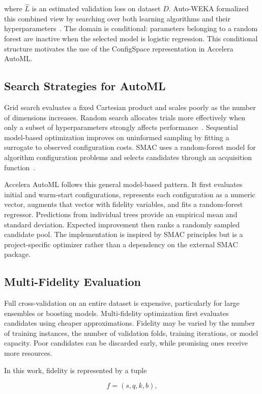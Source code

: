 \documentclass[12pt,a4paper]{report}
\begin{document}
\noindent where $\widehat{L}$ is an estimated validation loss on dataset $D$.
Auto-WEKA formalized this combined view by searching over both learning
algorithms and their hyperparameters~\cite{autoweka}. The domain is
conditional: parameters belonging to a random forest are inactive when the
selected model is logistic regression. This conditional structure motivates the
use of the ConfigSpace representation in Accelera AutoML.

\subsection{Search Strategies for AutoML}
Grid search evaluates a fixed Cartesian product and scales poorly as the number
of dimensions increases. Random search allocates trials more effectively when
only a subset of hyperparameters strongly affects performance~\cite{randomsearch}.
Sequential model-based optimization improves on uninformed sampling by fitting a
surrogate to observed configuration costs. SMAC uses a random-forest model for
algorithm configuration problems and selects candidates through an acquisition
function~\cite{smac}.

\medskip
\noindent Accelera AutoML follows this general model-based pattern. It first
evaluates initial and warm-start configurations, represents each configuration
as a numeric vector, augments that vector with fidelity variables, and fits a
random-forest regressor. Predictions from individual trees provide an empirical
mean and standard deviation. Expected improvement then ranks a randomly sampled
candidate pool. The implementation is inspired by SMAC principles but is a
project-specific optimizer rather than a dependency on the external SMAC
package.

\subsection{Multi-Fidelity Evaluation}
Full cross-validation on an entire dataset is expensive, particularly for large
ensembles or boosting models. Multi-fidelity optimization first evaluates
candidates using cheaper approximations. Fidelity may be varied by the number of
training instances, the number of validation folds, training iterations, or
model capacity. Poor candidates can be discarded early, while promising ones
receive more resources.

\noindent In this work, fidelity is represented by a tuple

\begin{equation}
  f = (s, q, k, b),
\end{equation}
\end{document}
